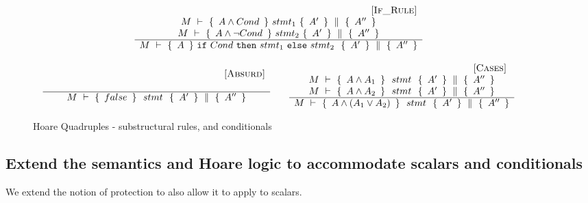 \begin{figure}[htb]
 $
\begin{array}{c}
\begin{array}{c} \strut \ \ \ \ \ \ \ \ \ \ \ \ \ \ \ \ \ \ \ \ \ \ \ \ \ \ \ \ \ \ \ \ \ \ \ \ \ \ \ \ \ \ \ \ \ \ \ \ \ \ {{\mbox{\hspace{2.5cm} [\sc{If\_Rule}]}}} \\ 
	 \begin{array}{c}
	  M\ \vdash\ \{\,\  A \wedge Cond \  \, \} \    stmt_1   \  \{\,\ A' \ \, \}\, \,\parallel\,\, \{\, \ A'' \  \, \}
	\\
	    M\ \vdash\ \{\,\  A \wedge \neg Cond \  \, \} \    stmt_2   \  \{\,\ A' \ \, \}\, \,\parallel\,\, \{\, \ A'' \  \, \}	
	\end{array}
	 \\ \hline   	
	M\ \vdash\ \{\,\  A \  \, \} \  \mbox{\normalfont{\texttt{if}}}\ Cond\ \mbox{\normalfont{\texttt{then}}}\ stmt_1\ \mbox{\normalfont{\texttt{else}}}\ stmt_2 \ \  \{\,\ A' \ \, \}\, \,\parallel\,\, \{\, \ A'' \  \, \}
 \end{array}
\\
\\
\begin{array}{lcl}
{
 \begin{array}{c} \strut \ \ \ \ \ \ \ \ \ \ \ \ \ \ \ \ \ \ \ \ \ \ \ \ \ \ \ \ \ \ \ \ \ \ \ \ \ \ \ \ \ \ \ \ \ \ \ \ \ \ {{\mbox{\hspace{0.5cm} [\sc{Absurd}]}}} \\ 	
	 \\ \hline   	
	M\ \vdash\ \{\,\  false \  \, \} \  \ stmt \ \  \{\,\ A' \ \, \}\, \,\parallel\,\, \{\, \ A'' \  \, \} 
 \end{array} 
} & &
{
\begin{array}{c} \strut \ \ \ \ \ \ \ \ \ \ \ \ \ \ \ \ \ \ \ \ \ \ \ \ \ \ \ \ \ \ \ \ \ \ \ \ \ \ \ \ \ \ \ \ \ \ \ \ \ \ {{\mbox{\hspace{0.5cm} [\sc{Cases}]}}} \\  \begin{array}{l}
	M\ \vdash\ \{\,\  A \wedge A_{1}  \  \, \} \  \ stmt \ \  \{\,\ A' \ \, \}\, \,\parallel\,\, \{\, \ A'' \  \, \}
		\\
		M\ \vdash\ \{\,\   A \wedge A_{2} \  \, \} \  \ stmt \ \  \{\,\ A' \ \, \}\, \,\parallel\,\, \{\, \ A'' \  \, \}
	\end{array}	
	 \\ \hline   	
	M\ \vdash\ \{\,\  A \wedge (A_1 \vee A_2) \  \, \} \  \ stmt \ \  \{\,\ A' \ \, \}\, \,\parallel\,\, \{\, \ A'' \  \, \}
 \end{array}
}
\end{array}
\end{array}
$
 \vspace{-.5cm}
\caption{Hoare Quadruples -    substructural rules, and conditionals }
\label{f:substructural:app}
\end{figure}

\subsection{Extend the semantics and Hoare logic to accommodate scalars and conditionals}
\label{s:app:scalars}

{We extend the notion of protection to also allow it to apply to scalars. }

